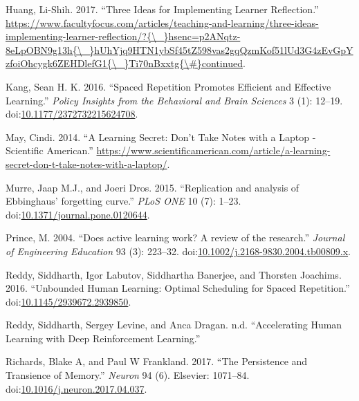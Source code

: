 \hypertarget{ref-Huang2017}{}
Huang, Li-Shih. 2017. ``Three Ideas for Implementing Learner
Reflection.''
\href{https://www.facultyfocus.com/articles/teaching-and-learning/three-ideas-implementing-learner-reflection/?\%7B/_\%7Dhsenc=p2ANqtz-8eLpOBN9g13h\%7B/_\%7DhUhYjq9HTN1ybSf45tZ598vas2gqQzmKof51lUd3G4zEvGpYzfoiOhcygk6ZEHDlefG1\%7B/_\%7DTi70nBxxtg\%7B/\#\%7Dcontinued}{https://www.facultyfocus.com/articles/teaching-and-learning/three-ideas-implementing-learner-reflection/?\{\textbackslash{}\_\}hsenc=p2ANqtz-8eLpOBN9g13h\{\textbackslash{}\_\}hUhYjq9HTN1ybSf45tZ598vas2gqQzmKof51lUd3G4zEvGpYzfoiOhcygk6ZEHDlefG1\{\textbackslash{}\_\}Ti70nBxxtg\{\textbackslash{}\#\}continued}.

\hypertarget{ref-Kang2016}{}
Kang, Sean H. K. 2016. ``Spaced Repetition Promotes Efficient and
Effective Learning.'' \emph{Policy Insights from the Behavioral and
Brain Sciences} 3 (1): 12--19.
doi:\href{https://doi.org/10.1177/2372732215624708}{10.1177/2372732215624708}.

\hypertarget{ref-May2014}{}
May, Cindi. 2014. ``A Learning Secret: Don't Take Notes with a Laptop -
Scientific American.''
\url{https://www.scientificamerican.com/article/a-learning-secret-don-t-take-notes-with-a-laptop/}.

\hypertarget{ref-Murre2015}{}
Murre, Jaap M.J., and Joeri Dros. 2015. ``Replication and analysis of
Ebbinghaus' forgetting curve.'' \emph{PLoS ONE} 10 (7): 1--23.
doi:\href{https://doi.org/10.1371/journal.pone.0120644}{10.1371/journal.pone.0120644}.

\hypertarget{ref-Prince2004}{}
Prince, M. 2004. ``Does active learning work? A review of the
research.'' \emph{Journal of Engineering Education} 93 (3): 223--32.
doi:\href{https://doi.org/10.1002/j.2168-9830.2004.tb00809.x}{10.1002/j.2168-9830.2004.tb00809.x}.

\hypertarget{ref-Reddy2016}{}
Reddy, Siddharth, Igor Labutov, Siddhartha Banerjee, and Thorsten
Joachims. 2016. ``Unbounded Human Learning: Optimal Scheduling for
Spaced Repetition.''
doi:\href{https://doi.org/10.1145/2939672.2939850}{10.1145/2939672.2939850}.

\hypertarget{ref-Reddy2017}{}
Reddy, Siddharth, Sergey Levine, and Anca Dragan. n.d. ``Accelerating
Human Learning with Deep Reinforcement Learning.''

\hypertarget{ref-Richards2017}{}
Richards, Blake A, and Paul W Frankland. 2017. ``The Persistence and
Transience of Memory.'' \emph{Neuron} 94 (6). Elsevier: 1071--84.
doi:\href{https://doi.org/10.1016/j.neuron.2017.04.037}{10.1016/j.neuron.2017.04.037}.

